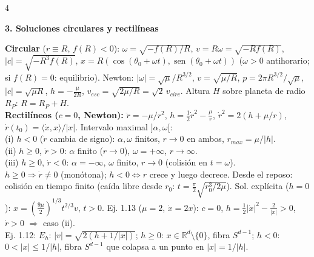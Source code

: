 \documentclass[8pt,a4paper,landscape]{extarticle}
\newcommand{\ip}[2]{\langle #1,#2\rangle}
\newcommand{\ab}[1]{\lvert #1\rvert}
\newcommand{\xd}{\dot x}
\newcommand{\R}{\mathbb{R}}
\DeclareMathOperator{\sen}{sen}
\newcommand{\seccion}[1]{\par\vspace{1.5pt}\noindent\colorbox{blue!12}{\parbox{\dimexpr\linewidth-2\fboxsep\relax}{\textbf{\textcolor{NavyBlue}{#1}}}}\par\vspace{0.5pt}}
\begin{document}
\begin{multicols}{4}
\seccion{3. Soluciones circulares y rectilíneas}
\textbf{Circular} ($r\equiv R$, $f(R)<0$): $\omega=\sqrt{-f(R)/R}$, $v=R\omega=\sqrt{-Rf(R)}$, $\ab c=\sqrt{-R^3f(R)}$, $x=R(\cos(\theta_0+\omega t),\sen(\theta_0+\omega t))$ ($\omega>0$ antihorario; si $f(R)=0$: equilibrio).
Newton: $\ab\omega=\sqrt\mu/R^{3/2}$, $v=\sqrt{\mu/R}$, $p=2\pi R^{3/2}/\sqrt\mu$, $\ab c=\sqrt{\mu R}$, $h=-\frac{\mu}{2R}$, $v_{esc}=\sqrt{2\mu/R}=\sqrt2\,v_{circ}$. Altura $H$ sobre planeta de radio $R_P$: $R=R_P+H$.\\
\textbf{Rectilíneos ($c=0$, Newton):} $\ddot r=-\mu/r^2$, $h=\frac12\dot r^2-\frac\mu r$, $\dot r^2=2(h+\mu/r)$, $\dot r(t_0)=\ip{\xd}{x}/\ab x$. Intervalo maximal $]\alpha,\omega[$:\\
(i) $h<0$ ($\dot r$ cambia de signo): $\alpha,\omega$ finitos, $r\to0$ en ambos, $r_{max}=\mu/\ab h$.\\
(ii) $h\ge0$, $\dot r>0$: $\alpha$ finito ($r\to0$), $\omega=+\infty$, $r\to\infty$.\\
(iii) $h\ge0$, $\dot r<0$: $\alpha=-\infty$, $\omega$ finito, $r\to0$ (colisión en $t=\omega$).\\
$h\ge0\Rightarrow\dot r\ne0$ (monótona); $h<0\iff r$ crece y luego decrece. Desde el reposo: colisión en tiempo finito (caída libre desde $r_0$: $t=\frac\pi2\sqrt{r_0^3/2\mu}$). Sol. explícita ($h=0$): $x=(\frac{9\mu}{2})^{1/3}t^{2/3}v$, $t>0$. Ej. 1.13 ($\mu=2$, $\xd=2x$): $c=0$, $h=\frac12\ab\xd^2-\frac{2}{\ab x}>0$, $\dot r>0$ $\Rightarrow$ caso (ii).\\
Ej. 1.12: $E_h$: $\ab v=\sqrt{2(h+1/\ab x)}$; $h\ge0$: $x\in\R^d\!\setminus\!\{0\}$, fibra $S^{d-1}$; $h<0$: $0<\ab x\le1/\ab h$, fibra $S^{d-1}$ que colapsa a un punto en $\ab x=1/\ab h$.


\end{multicols}
\end{document}
